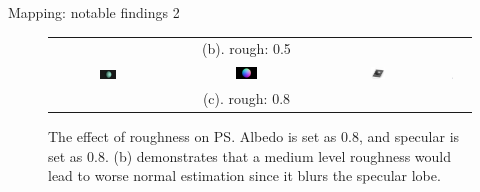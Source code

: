 \documentclass[10pt]{beamer}
\begin{document}
\begin{frame}{Mapping: notable findings 2}
\begin{figure}[!htbp]
\begin{tabular}{c|ccc}
  & (b). rough: 0.5\\
  \includegraphics[width=0.15\textwidth]{mapping/ps_spec_rough/0808_0001}&
  \includegraphics[width=0.15\textwidth]{mapping/ps_spec_rough/0808_normal}&
  \includegraphics[width=0.15\textwidth]{images/0808_dmap}&
  \includegraphics[width=0.03\textwidth]{mapping/ps_spec_rough/0808_ang_error}\\
  & (c). rough: 0.8\\
\end{tabular}
\caption{The effect of roughness on PS. Albedo is set as 0.8, and specular is set as 0.8. (b) demonstrates that a medium level roughness would lead to worse normal estimation since it blurs the specular lobe.}
\end{figure}

\end{frame}
\end{document}
